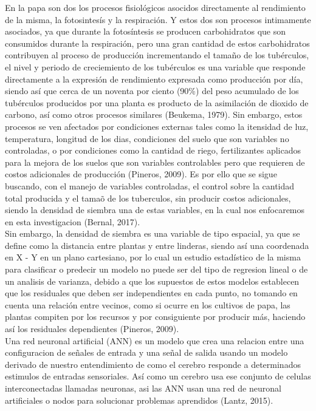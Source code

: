 En la papa son dos los procesos fisiológicos asocidos directamente al rendimiento de la misma, la fotosintesís y la respiración. Y estos dos son procesos intimamente asociados, ya que durante la fotosíntesis se producen carbohidratos que son consumidos durante la respiración, pero una gran cantidad de estos carbohidratos contribuyen al proceso de producción incrementando el tama\~no de los tubérculos, el nivel y periodo de creciemiento de los tubérculos es una variable que responde directamente a la expresión de rendimiento expresada como producción por día, siendo así que cerca de un noventa por ciento (90\%) del peso acumulado de los tubérculos producidos por una planta es producto de la asimilación de dioxido de carbono, así como otros procesos similares (Beukema, 1979). Sin embargo, estos procesos se ven afectados por condiciones externas tales como la itensidad de luz, temperatura, longitud de los dias, condiciones del suelo que son variables no controladas, o por condiciones como la cantidad de riego, fertilizantes aplicados para la mejora de los suelos que son variables controlables pero que requieren de costos adicionales de producción (Pineros, 2009). Es por ello que se sigue buscando, con el manejo de variables controladas,  el control sobre la cantidad total producida y el tama\~o de los tuberculos,  sin producir costos adicionales, siendo la densidad de siembra una de estas variables, en la cual nos enfocaremos en esta investigacion (Bernal, 2017).\\

Sin embargo,  la densidad de siembra es una variable de tipo espacial, ya que se define como la distancia entre plantas y entre linderas, siendo así una coordenada en X - Y en un plano cartesiano, por lo cual un estudio estadístico de la misma para clasificar o predecir un modelo no puede ser del tipo de regresion lineal o de un analisis de varianza,  debido a que los supuestos de estos modelos establecen que los residuales que deben ser independientes en cada punto, no tomando en cuenta una relación entre vecinos, como si ocurre en los cultivos de papa, las plantas compiten por los recursos y por consiguiente por producir más, haciendo así los residuales dependientes  (Pineros, 2009). \\

Una red neuronal artificial (ANN) es un modelo que crea una relacion entre una configuracion de señales de entrada y una señal de salida usando un modelo derivado de nuestro entendimiento de como el cerebro responde a determinados estimulos de entradas sensoriales. Así como un cerebro usa ese conjunto de celulas interconectadas llamadas neuronas, asi las ANN usan una red de neuronal artificiales o nodos para solucionar problemas aprendidos (Lantz, 2015).\\

